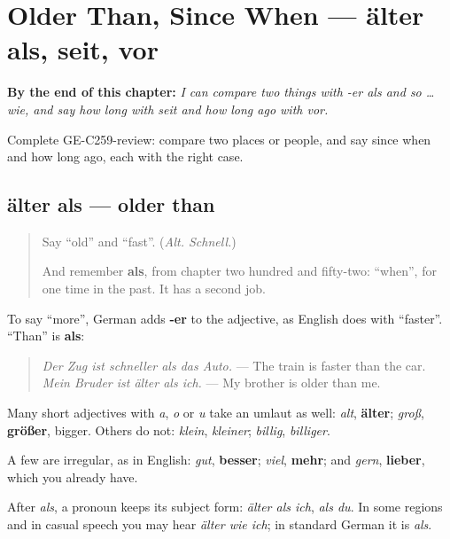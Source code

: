 
\chapter{Older Than, Since When — älter als, seit, vor}
\label{ch:ge-older-than-since-when}

\begin{chapteropening}
\textbf{By the end of this chapter:} \emph{I can compare two things with -er als and so … wie, and say how long with seit and how long ago with vor.}

Complete GE-C259-review: compare two places or people, and say since when and how long ago, each with the right case.
\end{chapteropening}

\section[älter als, so alt wie]{älter als — older than}

\label{lesson:GE-C259-aelter-als}



\begin{quote}
Say \textquotedblleft{}old\textquotedblright{} and \textquotedblleft{}fast\textquotedblright{}. (\emph{Alt. Schnell.})

And remember \textbf{als}, from chapter two hundred and fifty-two: \textquotedblleft{}when\textquotedblright{}, for one time in the past. It has a second job.
\end{quote}

\begin{grammarlens}[title={Grammar Lens: -er, then als}]
To say \textquotedblleft{}more\textquotedblright{}, German adds \textbf{-er} to the adjective, as English does with \textquotedblleft{}faster\textquotedblright{}. \textquotedblleft{}Than\textquotedblright{} is \textbf{als}:

\begin{quote}
\emph{Der Zug ist schneller als das Auto.} — The train is faster than the car. \emph{Mein Bruder ist älter als ich.} — My brother is older than me.
\end{quote}

Many short adjectives with \emph{a}, \emph{o} or \emph{u} take an umlaut as well: \emph{alt}, \textbf{älter}; \emph{groß}, \textbf{größer}, bigger. Others do not: \emph{klein}, \emph{kleiner}; \emph{billig}, \emph{billiger}.

A few are irregular, as in English: \emph{gut}, \textbf{besser}; \emph{viel}, \textbf{mehr}; and \emph{gern}, \textbf{lieber}, which you already have.

After \emph{als}, a pronoun keeps its subject form: \emph{älter als ich}, \emph{als du}. In some regions and in casual speech you may hear \emph{älter wie ich}; in standard German it is \emph{als}.
\end{grammarlens}

